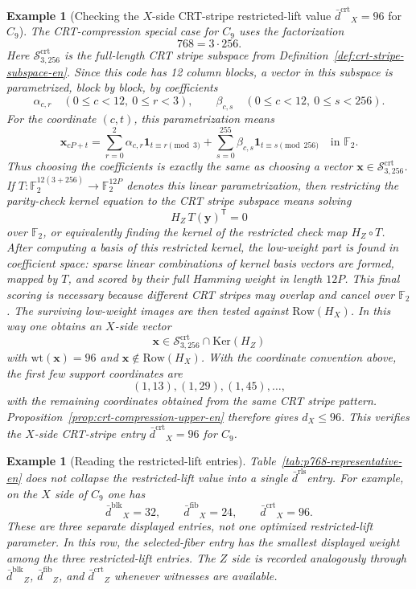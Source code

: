 \documentclass[11pt]{article}
\newcommand{\Ftwo}{\mathbb{F}_2}
\newcommand{\Ker}{\mathrm{Ker}}
\newcommand{\Row}{\mathrm{Row}}
\newcommand{\wt}{\mathrm{wt}}
\newcommand{\dbound}[1]{\ensuremath{\bar{d}^{\mathrm{#1}}}}
\newcommand{\drls}{\dbound{rls}}
\newcommand{\dblk}{\dbound{blk}}
\newcommand{\dfib}{\dbound{fib}}
\newcommand{\dcrt}{\dbound{crt}}
\newcommand{\markededit}[1]{#1}
\newcommand{\vect}[1]{\bm{#1}}
\newcommand{\vx}{\vect{x}}
\newcommand{\vy}{\vect{y}}
\theoremstyle{uprightthm}
\newtheorem{example}[theorem]{Example}
\begin{document}
\begin{example}[Checking the $X$-side CRT-stripe restricted-lift value \texorpdfstring{\(\dcrt_X=96\)}{dbar-crt-X=96} for \(C_9\)]
The CRT-compression special case for $C_9$ uses the factorization
\[
768=3\cdot 256.
\]
Here $\mathcal{S}^{\mathrm{crt}}_{3,256}$ is the full-length CRT stripe subspace
from Definition~\ref{def:crt-stripe-subspace-en}.  Since this code has
12 column blocks, a vector in this subspace is parametrized, block by block, by
coefficients
\[
\alpha_{c,r}\quad (0\le c<12,\ 0\le r<3),
\qquad
\beta_{c,s}\quad (0\le c<12,\ 0\le s<256).
\]
For the coordinate $(c,t)$, this parametrization means
\[
\vx_{cP+t}
=
\sum_{r=0}^{2}\alpha_{c,r}\mathbf{1}_{t\equiv r\!\!\!\pmod 3}
+
\sum_{s=0}^{255}\beta_{c,s}\mathbf{1}_{t\equiv s\!\!\!\pmod {256}}
\quad\text{in }\Ftwo.
\]
Thus choosing the coefficients is exactly the same as choosing a vector
$\vx\in\mathcal{S}^{\mathrm{crt}}_{3,256}$.
If $T:\Ftwo^{12(3+256)}\to\Ftwo^{12P}$ denotes this linear parametrization,
then restricting the parity-check kernel equation to the CRT stripe subspace
means solving
\[
H_Z\,T(\vy)^{\mathsf T}=0
\]
over $\Ftwo$, or equivalently finding the kernel of the restricted check map
$H_Z\circ T$.  After computing a basis of this restricted kernel, the
low-weight part is found in coefficient space: sparse linear combinations of
kernel basis vectors are formed, mapped by $T$, and scored by their full
Hamming weight in length $12P$.  This final scoring is necessary because
different CRT stripes may overlap and cancel over $\Ftwo$.  The surviving
low-weight images are then tested against $\Row(H_X)$.  In this way one obtains
an $X$-side vector
\[
\vx\in \mathcal{S}^{\mathrm{crt}}_{3,256}\cap\Ker(H_Z)
\]
with $\wt(\vx)=96$ and $\vx\notin\Row(H_X)$.  With the coordinate convention
above, the first few support coordinates are
\[
(1,13),(1,29),(1,45),\ldots,
\]
with the remaining coordinates obtained from the same CRT stripe pattern.
Proposition~\ref{prop:crt-compression-upper-en} therefore \markededit{gives}
$d_X\le 96$.  This verifies the $X$-side CRT-stripe entry $\dcrt_X=96$ for
$C_9$.
\end{example}

\begin{example}[Reading the restricted-lift entries]
Table~\ref{tab:p768-representative-en} does not collapse the restricted-lift
value into a single \drls entry.  For example, on the $X$ side of $C_9$ one has
\[
\dblk_X=32,\qquad \dfib_X=24,\qquad \dcrt_X=96.
\]
These are three separate displayed \markededit{entries}, not one optimized
restricted-lift parameter.  In this row, the selected-fiber \markededit{entry} has the
smallest displayed weight among the three restricted-lift entries.  The $Z$ side
is recorded analogously through
$\dblk_Z$, $\dfib_Z$, and $\dcrt_Z$ whenever witnesses are available.
\end{example}
\end{document}
